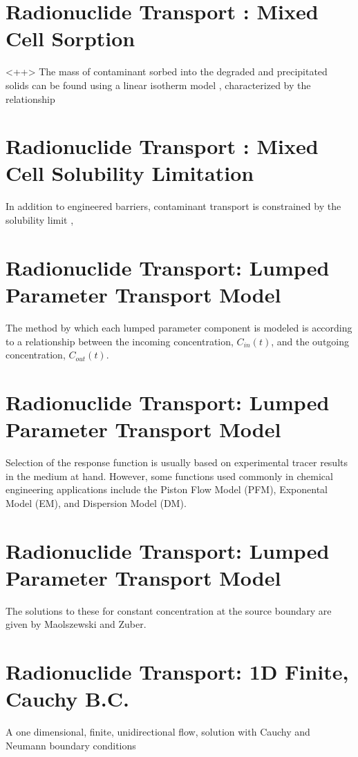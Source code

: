 \documentclass[letterpaper]{article}
\begin{document}
  \section*{Radionuclide Transport : Mixed Cell Sorption}
<++>
The mass of contaminant sorbed into the degraded and precipitated solids can be
found using a linear isotherm model \cite{schwartz_fundamentals_2004},
characterized by the relationship 

  \section*{Radionuclide Transport : Mixed Cell Solubility Limitation}
In addition to engineered barriers, contaminant transport is constrained by 
  the solubility limit \cite{hedin_integrated_2002}, 

  \section*{Radionuclide Transport: Lumped Parameter Transport Model}
The method by which each lumped parameter component is modeled is
according to a relationship between the incoming concentration, $C_{in}(t)$,
and the outgoing concentration, $C_{out}(t)$.

  \section*{Radionuclide Transport: Lumped Parameter Transport Model}
Selection of the response function is usually based on experimental tracer
results in the medium at hand. However, some functions used commonly in
chemical engineering applications \cite{maloszewski_lumped_1996} include the
Piston Flow Model (PFM), Exponental Model (EM), and Dispersion Model (DM). 

  \section*{Radionuclide Transport: Lumped Parameter Transport Model}
The solutions to these for constant concentration at the 
source boundary are given by Maolszewski and Zuber.

  \section*{Radionuclide Transport: 1D Finite, Cauchy B.C.}
  A one dimensional, finite, unidirectional flow,
  solution with Cauchy and Neumann boundary conditions
\end{document}
